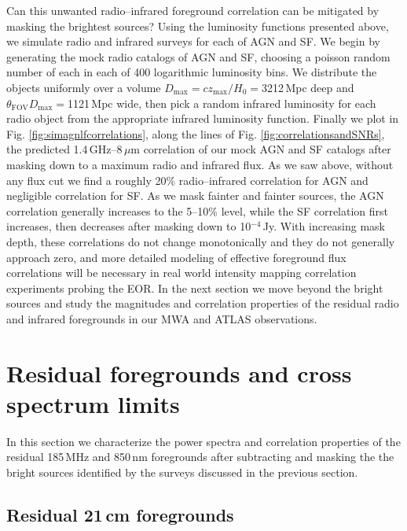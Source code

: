 \documentclass{emulateapj}
\newcommand{\maxtext}{\text{max}}
\begin{document}
Can this unwanted radio--infrared foreground correlation can be mitigated by masking the brightest sources? Using the luminosity functions presented above, we simulate radio and infrared surveys for each of AGN and SF. We begin by generating the mock radio catalogs of AGN and SF, choosing a poisson random number of each in each of 400 logarithmic luminosity bins. We distribute the objects uniformly over a volume $D_\maxtext=cz_\maxtext/H_0=$3212\,Mpc deep and $\theta_{\text{FOV}}D_\maxtext=$1121\,Mpc wide, then pick a random infrared luminosity for each radio object from the appropriate infrared luminosity function. Finally we plot in Fig. \ref{fig:simagnlfcorrelations}, along the lines of Fig. \ref{fig:correlationsandSNRs}, the predicted 1.4\,GHz--8\,$\mu$m correlation of our mock AGN and SF catalogs after masking down to a maximum radio and infrared flux. As we saw above, without any flux cut we find a roughly 20\% radio--infrared correlation for AGN and negligible correlation for SF. As we mask fainter and fainter sources, the AGN correlation generally increases to the 5--10\% level, while the SF correlation first increases, then decreases after masking down to 10$^{-4}$\,Jy. With increasing mask depth, these correlations do not change monotonically and they do not generally approach zero, and more detailed modeling of effective foreground flux correlations will be necessary in real world intensity mapping correlation experiments probing the EOR. In the next section we move beyond the bright sources and study the magnitudes and correlation properties of the residual radio and infrared foregrounds in our MWA and ATLAS observations.


\section{Residual foregrounds and cross spectrum limits}

In this section we characterize the power spectra and correlation properties of the residual 185\,MHz and 850\,nm foregrounds after subtracting and masking  the the bright sources identified by the surveys discussed in the previous section.

\subsection{Residual 21\,cm foregrounds}
\label{sec:res21fgs}
\end{document}
